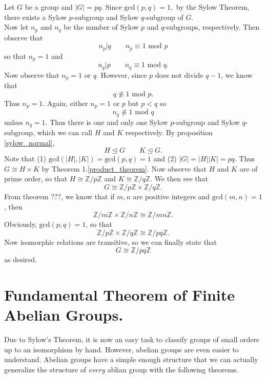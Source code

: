     \begin{prf}
        Let $G$ be a group and $|G| = pq$. Since $\mbox{gcd}(p, q) = 1,$
        by the Sylow Theorem, 
        there exists a Sylow $p$-subgroup and Sylow $q$-subgroup of $G$. 
        \\
        Now let $n_p$ and $n_q$ be the number of Sylow $p$ and $q$-subgroups,
        respectively. Then observe that 
        \[
          n_p \big|q \qquad n_p \equiv 1 \mbox{ mod } p   
        \]
        so that $n_p = 1$ and 
        \[
            n_q \big|p   \qquad n_q \equiv 1 \mbox{ mod } q.
        \]
        Now observe that $n_p = 1$ or $q$. However, since $p$ does not divide
        $q - 1$, we know that 
        \[
          q \not\equiv 1 \mbox{ mod } p.  
        \]
        Thus $n_p = 1$. Again, either $n_p = 1$ or $p$ but $p < q$ so 
        \[
           n_q \not\equiv 1 \mbox{ mod } q 
        \]
        unless $n_q = 1$. Thus there is one and only one Sylow $p$-subgroup
        and Sylow $q$-subgroup, which we can call $H$ and $K$ respectively.
        By proposition \ref{sylow_normal}, 
        \[
          H \unlhd G \qquad K \unlhd G.  
        \]
        Note that (1)
        $\mbox{gcd}(|H|, |K|) = \mbox{gcd}(p, q) = 1$ and (2) $|G| = |H||K| =
        pq$. Thus $G \cong H \times K$ by Theorem 1.\ref{product_theorem}. Now observe that $H$ and $K$ are of
        prime order, so that $H \cong \mathbb{Z}/p\mathbb{Z}$ and $K \cong
        \mathbb{Z}/q\mathbb{Z}$. We then see that 
        \[
           G \cong  \mathbb{Z}/p\mathbb{Z} \times \mathbb{Z}/q\mathbb{Z}.
        \]
        From theorem ???, we know that if $m, n$ are positive
        integers and $\mbox{gcd}(m, n) = 1$, then 
        \[
            \mathbb{Z}/m\mathbb{Z} \times \mathbb{Z}/n\mathbb{Z} 
            \cong \mathbb{Z}/mn\mathbb{Z}.
        \]
        Obviously, $\mbox{gcd}(p, q) = 1$, so that 
        \[
            \mathbb{Z}/p\mathbb{Z} \times \mathbb{Z}/q\mathbb{Z}
            \cong \mathbb{Z}/pq\mathbb{Z}.
        \] 
        Now isomorphic relations are transitive, so we can finally state that 
        \[
           G \cong \mathbb{Z}/pq\mathbb{Z}
        \]
        as desired.
    \end{prf}

    \newpage
    \section{Fundamental Theorem of Finite Abelian Groups.}
    
    Due to Sylow's Theorem, it is now an easy task to classify groups
    of small orders up to an isomorphism by hand. However, abelian
    groups are even easier to understand. Abelian groups have a simple
    enough structure that we can actually generalize the structure of
    \textit{every} ablian group with the following theorems.

